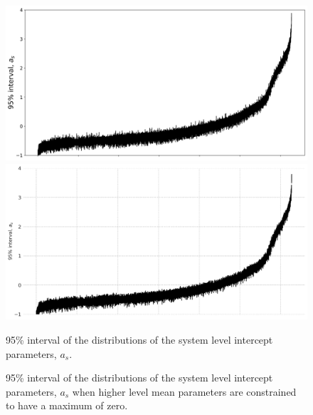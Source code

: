 \documentclass[a4paper]{article}
\begin{document}

\begin{figure}
\begin{minipage}{.45\textwidth}
  \centering
  \includegraphics[width=1\linewidth]{figures/Bay_as.png}
 \end{minipage}\qquad
\begin{minipage}{.45\textwidth}
  \centering
  \includegraphics[width=1\linewidth]{figures/Bay_as_const.png}
 \end{minipage}

\bigskip

\begin{minipage}[t]{.45\textwidth}
\centering
  \caption{95\% interval of the distributions of the system level intercept parameters, $a_s$.}
    \label{fig:Bay_as}
\end{minipage}\qquad
\begin{minipage}[t]{.45\textwidth}
\centering
  \caption{95\% interval of the distributions of the system level intercept parameters, $a_s$ when higher level mean parameters are constrained to have a maximum of zero.}
   \label{fig:Bay_as_const}
\end{minipage}
\end{figure}
\end{document}
